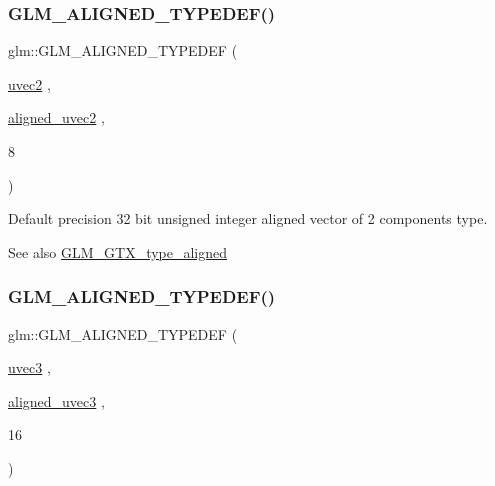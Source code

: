 \subsubsection{\texorpdfstring{G\+L\+M\+\_\+\+A\+L\+I\+G\+N\+E\+D\+\_\+\+T\+Y\+P\+E\+D\+E\+F()}{GLM\_ALIGNED\_TYPEDEF()}\hspace{0.1cm}{\footnotesize\ttfamily [118/209]}}
{\footnotesize\ttfamily glm\+::\+G\+L\+M\+\_\+\+A\+L\+I\+G\+N\+E\+D\+\_\+\+T\+Y\+P\+E\+D\+EF (\begin{DoxyParamCaption}\item[{\hyperlink{group__core__types_gafd2041b45eff671aa8899d2c2835eee9}{uvec2}}]{,  }\item[{\hyperlink{group__gtc__type__aligned_gacddd39189c2dedf7dd48c02155279124}{aligned\+\_\+uvec2}}]{,  }\item[{8}]{ }\end{DoxyParamCaption})}

Default precision 32 bit unsigned integer aligned vector of 2 components type. \begin{DoxySeeAlso}{See also}
\hyperlink{group__gtx__type__aligned}{G\+L\+M\+\_\+\+G\+T\+X\+\_\+type\+\_\+aligned} 
\end{DoxySeeAlso}
\mbox{\label{group__gtx__type__aligned_ga5cec574686a7f3c8ed24bb195c5e2d0a}} 
\subsubsection{\texorpdfstring{G\+L\+M\+\_\+\+A\+L\+I\+G\+N\+E\+D\+\_\+\+T\+Y\+P\+E\+D\+E\+F()}{GLM\_ALIGNED\_TYPEDEF()}\hspace{0.1cm}{\footnotesize\ttfamily [119/209]}}
{\footnotesize\ttfamily glm\+::\+G\+L\+M\+\_\+\+A\+L\+I\+G\+N\+E\+D\+\_\+\+T\+Y\+P\+E\+D\+EF (\begin{DoxyParamCaption}\item[{\hyperlink{group__core__types_gac4ba593917841b859ba1683b8b52b8fa}{uvec3}}]{,  }\item[{\hyperlink{group__gtc__type__aligned_ga5dee635ca69be0f5de5630a59d89034f}{aligned\+\_\+uvec3}}]{,  }\item[{16}]{ }\end{DoxyParamCaption})}

